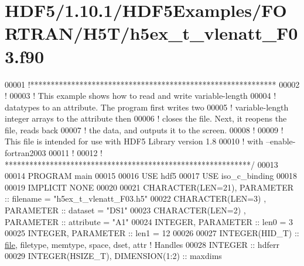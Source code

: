 \hypertarget{_h_d_f5_21_810_81_2_h_d_f5_examples_2_f_o_r_t_r_a_n_2_h5_t_2h5ex__t__vlenatt___f03_8f90_source}{}\section{H\+D\+F5/1.10.1/\+H\+D\+F5\+Examples/\+F\+O\+R\+T\+R\+A\+N/\+H5\+T/h5ex\+\_\+t\+\_\+vlenatt\+\_\+\+F03.f90}
\label{_h_d_f5_21_810_81_2_h_d_f5_examples_2_f_o_r_t_r_a_n_2_h5_t_2h5ex__t__vlenatt___f03_8f90_source}

\begin{DoxyCode}
00001 \textcolor{comment}{!************************************************************}
00002 \textcolor{comment}{!}
00003 \textcolor{comment}{!  This example shows how to read and write variable-length}
00004 \textcolor{comment}{!  datatypes to an attribute.  The program first writes two}
00005 \textcolor{comment}{!  variable-length integer arrays to the attribute then}
00006 \textcolor{comment}{!  closes the file.  Next, it reopens the file, reads back}
00007 \textcolor{comment}{!  the data, and outputs it to the screen.}
00008 \textcolor{comment}{!}
00009 \textcolor{comment}{!  This file is intended for use with HDF5 Library version 1.8}
00010 \textcolor{comment}{!  with --enable-fortran2003 }
00011 \textcolor{comment}{!}
00012 \textcolor{comment}{! ************************************************************/}
00013 
00014 \textcolor{keyword}{PROGRAM} main
00015 
00016   \textcolor{keywordtype}{USE }hdf5
00017   \textcolor{keywordtype}{USE }iso\_c\_binding
00018   
00019   \textcolor{keywordtype}{IMPLICIT NONE}
00020 
00021   \textcolor{keywordtype}{CHARACTER(LEN=21)}, \textcolor{keywordtype}{PARAMETER} :: filename  = \textcolor{stringliteral}{"h5ex\_t\_vlenatt\_F03.h5"}
00022   \textcolor{keywordtype}{CHARACTER(LEN=3)} , \textcolor{keywordtype}{PARAMETER} :: dataset   = \textcolor{stringliteral}{"DS1"}
00023   \textcolor{keywordtype}{CHARACTER(LEN=2)} , \textcolor{keywordtype}{PARAMETER} :: attribute = \textcolor{stringliteral}{"A1"}
00024   \textcolor{keywordtype}{INTEGER}, \textcolor{keywordtype}{PARAMETER} :: len0 = 3
00025   \textcolor{keywordtype}{INTEGER}, \textcolor{keywordtype}{PARAMETER} :: len1 = 12
00026 
00027   \textcolor{keywordtype}{INTEGER(HID\_T)}  :: \hyperlink{structfile}{file}, filetype, memtype, space, dset, attr \textcolor{comment}{! Handles}
00028   \textcolor{keywordtype}{INTEGER} :: hdferr
00029   \textcolor{keywordtype}{INTEGER(HSIZE\_T)}, \textcolor{keywordtype}{DIMENSION(1:2)}   :: maxdims

\end{DoxyCode}
